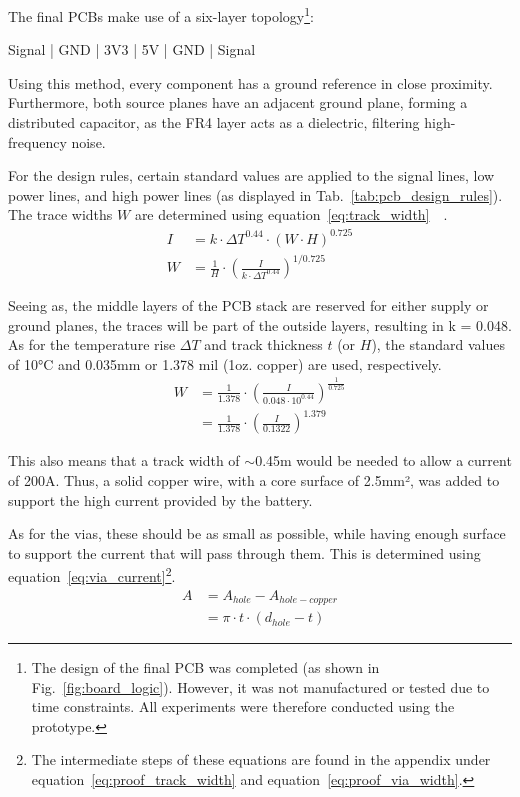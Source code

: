 \documentclass[conference,a4paper]{IEEEtran}
\newcommand{\ParagraphSeperator}{
  \setlength{\parskip}{0em}
  \setlength{\parindent}{10pt}
}
\begin{document}
\noindent The final PCBs make use of a six-layer topology\footnote{The design of the final PCB was completed (as shown in Fig.~\ref{fig:board_logic}). However, it was not manufactured or tested due to time constraints. All experiments were therefore conducted using the prototype.}: 

\noindent\centerline{Signal | GND | 3V3 | 5V | GND | Signal}

\noindent Using this method, every component has a ground reference in close proximity.
Furthermore, both source planes have an adjacent ground plane, forming a distributed capacitor, as the FR4 layer acts as a dielectric, filtering high-frequency noise.

\ParagraphSeperator
For the design rules, certain standard values are applied to the signal lines, low power lines, and high power lines (as displayed in Tab.~\ref{tab:pcb_design_rules}).
The trace widths $W$ are determined using equation~\ref{eq:track_width}~~\cite{Daems2023,IPC1998}.
\begin{align}
    \label{eq:track_current}
    I & = k \cdot \Delta T^{0.44} \cdot (W \cdot H)^{0.725} \\
    W & = \frac{1}{H} \cdot \left(\frac{I}{k \cdot \Delta T^{0.44}}\right)^{1/0.725}
\end{align}

Seeing as, the middle layers of the PCB stack are reserved for either supply or ground planes, the traces will be part of the outside layers, resulting in k = 0.048.
As for the temperature rise $\Delta T$ and track thickness $t$ (or $H$), the standard values of 10°C and 0.035mm or 1.378 mil (1oz. copper) are used, respectively.
\begin{align}
    \label{eq:track_width}
    W & = \frac{1}{1.378} \cdot \left(\frac{I}{0.048 \cdot 10^{0.44}}\right)^{\frac{1}{0.725}} \\
	  & = \frac{1}{1.378} \cdot \left(\frac{I}{0.1322}\right)^{1.379}
\end{align}

This also means that a track width of $\sim$0.45m would be needed to allow a current of 200A.
Thus, a solid copper wire, with a core surface of 2.5mm², was added to support the high current provided by the battery.

\ParagraphSeperator
As for the vias, these should be as small as possible, while having enough surface to support the current that will pass through them.
This is determined using equation~\ref{eq:via_current}\footnote{The intermediate steps of these equations are found in the appendix under equation~\ref{eq:proof_track_width} and equation~\ref{eq:proof_via_width}.}.
\begin{align}
    \label{eq:via_surface}
    A & = A_{hole} - A_{hole - copper} \\
	  & = \pi \cdot t \cdot (d_{hole} - t)
\end{align}
\end{document}

